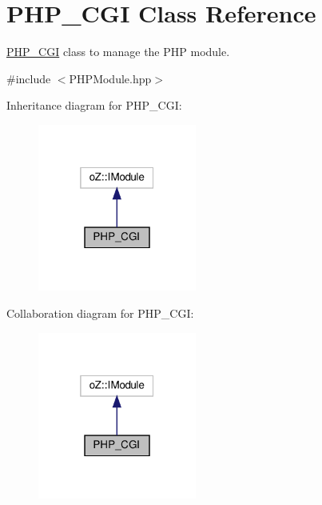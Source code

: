 \hypertarget{class_p_h_p___c_g_i}{}\section{P\+H\+P\+\_\+\+C\+GI Class Reference}
\label{class_p_h_p___c_g_i}


\hyperlink{class_p_h_p___c_g_i}{P\+H\+P\+\_\+\+C\+GI} class to manage the P\+HP module.  




{\ttfamily \#include $<$P\+H\+P\+Module.\+hpp$>$}



Inheritance diagram for P\+H\+P\+\_\+\+C\+GI\+:\nopagebreak
\begin{figure}[H]
\begin{center}
\leavevmode
\includegraphics[width=148pt]{class_p_h_p___c_g_i__inherit__graph}
\end{center}
\end{figure}


Collaboration diagram for P\+H\+P\+\_\+\+C\+GI\+:\nopagebreak
\begin{figure}[H]
\begin{center}
\leavevmode
\includegraphics[width=148pt]{class_p_h_p___c_g_i__coll__graph}
\end{center}
\end{figure}
